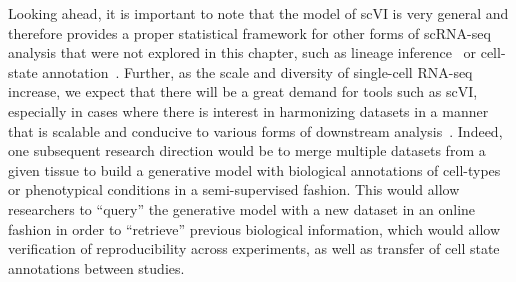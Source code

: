 Looking ahead, it is important to note that the model of scVI is very general and therefore provides a proper statistical framework for other forms of scRNA-seq analysis that were not explored in this chapter, such as lineage inference~\cite{Semrau2017} or cell-state annotation~\cite{tanay2017scaling,wagner2016revealing}. Further, as the scale and diversity of single-cell RNA-seq increase, we expect that there will be a great demand for tools such as scVI, especially in cases where there is interest in harmonizing datasets in a manner that is scalable and conducive to various forms of downstream analysis~\cite{Regev2017}. Indeed, one subsequent research direction would be to merge multiple datasets from a given tissue to build a generative model with biological annotations of cell-types or phenotypical conditions in a semi-supervised fashion. This would allow researchers to ``query'' the generative model with a new dataset in an online fashion in order to ``retrieve'' previous biological information, which would allow verification of reproducibility across experiments, as well as transfer of cell state annotations between studies.

